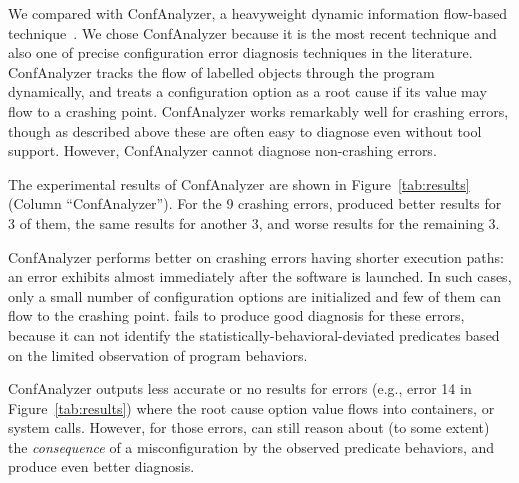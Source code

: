 We compared \ourtool with ConfAnalyzer, a heavyweight dynamic information
flow-based technique~\cite{Rabkin:2011:PPC}.
We chose ConfAnalyzer because it is the most recent technique and
also one of precise configuration error diagnosis techniques
in the literature.
ConfAnalyzer tracks the flow of labelled objects through the
program dynamically,
and treats a configuration option as a root cause if its
value may flow to a crashing point.
ConfAnalyzer works remarkably well for crashing errors, though as
described above these are often easy to diagnose even without tool
support. However, ConfAnalyzer cannot diagnose non-crashing errors.

The experimental results of ConfAnalyzer are shown in Figure~\ref{tab:results} (Column ``ConfAnalyzer'').
For the 9 crashing errors, \ourtool produced better results for 3 of them,
the same results for another 3, and worse results for the remaining 3.

ConfAnalyzer performs better on crashing errors
having shorter execution paths: an error exhibits
almost immediately after the software is launched.
In such cases, only a small number of configuration options are initialized and
few of them can flow to the crashing point. 
\ourtool fails to produce good diagnosis for these errors, because it can not identify
 the statistically-behavioral-deviated predicates based on the limited
observation of program behaviors.

ConfAnalyzer outputs less accurate or no results
for errors (e.g., error 14 in Figure~\ref{tab:results}) where the root cause option value
flows into containers, or system calls. However, for those errors,
\ourtool can still reason about (to some extent) the \textit{consequence} of a misconfiguration
by the observed predicate behaviors, and produce even better diagnosis.






